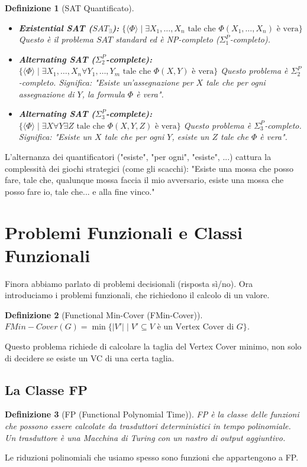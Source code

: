 \documentclass[a4paper]{article}
\newtheorem{definition}{Definizione}
\begin{document}
\begin{definition}[SAT Quantificato]
\begin{itemize}
    \item \textbf{Existential SAT ($SAT_{\exists}$):}
    $\{ \langle \Phi \rangle \mid \exists X_1, \dots, X_n \text{ tale che } \Phi(X_1, \dots, X_n) \text{ è vera} \}$
    Questo è il problema $SAT$ standard ed è NP-completo ($\Sigma_1^P$-completo).
    \item \textbf{Alternating SAT ($\Sigma_2^P$-complete):}
    $\{ \langle \Phi \rangle \mid \exists X_1, \dots, X_n \forall Y_1, \dots, Y_m \text{ tale che } \Phi(X, Y) \text{ è vera} \}$
    Questo problema è $\Sigma_2^P$-completo. Significa: "Esiste un'assegnazione per $X$ tale che per ogni assegnazione di $Y$, la formula $\Phi$ è vera".
    \item \textbf{Alternating SAT ($\Sigma_3^P$-complete):}
    $\{ \langle \Phi \rangle \mid \exists X \forall Y \exists Z \text{ tale che } \Phi(X, Y, Z) \text{ è vera} \}$
    Questo problema è $\Sigma_3^P$-completo. Significa: "Esiste un $X$ tale che per ogni $Y$, esiste un $Z$ tale che $\Phi$ è vera".
\end{itemize}
\end{definition}

L'alternanza dei quantificatori ("esiste", "per ogni", "esiste", ...) cattura la complessità dei giochi strategici (come gli scacchi): "Esiste una mossa che posso fare, tale che, qualunque mossa faccia il mio avversario, esiste una mossa che posso fare io, tale che... e alla fine vinco."

\section{Problemi Funzionali e Classi Funzionali}
Finora abbiamo parlato di problemi decisionali (risposta sì/no). Ora introduciamo i problemi funzionali, che richiedono il calcolo di un valore.

\begin{definition}[Functional Min-Cover (FMin-Cover)]
$FMin-Cover(G) = \min \{ |V'| \mid V' \subseteq V \text{ è un Vertex Cover di } G \}$.
\end{definition}
Questo problema richiede di calcolare la taglia del Vertex Cover minimo, non solo di decidere se esiste un VC di una certa taglia.

\subsection{La Classe FP}
\begin{definition}[FP (Functional Polynomial Time)]
FP è la classe delle funzioni che possono essere calcolate da trasduttori deterministici in tempo polinomiale. Un trasduttore è una Macchina di Turing con un nastro di output aggiuntivo.
\end{definition}
Le riduzioni polinomiali che usiamo spesso sono funzioni che appartengono a FP.
\end{document}
